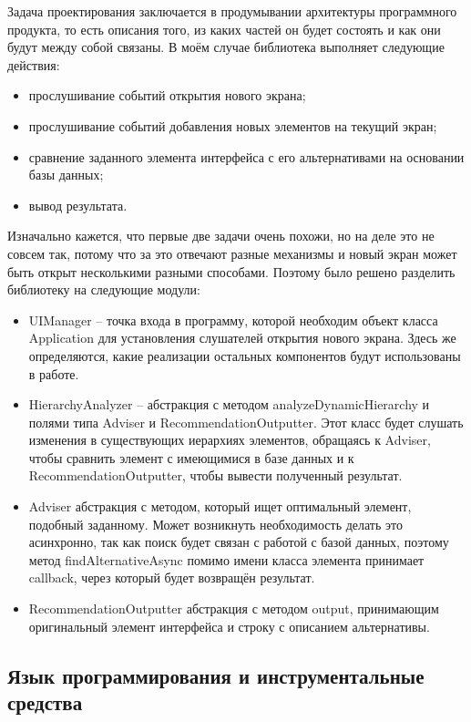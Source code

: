 \documentclass[a4paper,14pt]{extarticle} %
\begin{document}
	Задача проектирования заключается в продумывании архитектуры программного продукта, то есть описания того, из каких частей он будет состоять и как они будут между собой связаны. В моём случае библиотека выполняет следующие действия:
	\begin{itemize}
		\item прослушивание событий открытия нового экрана;
		\item прослушивание событий добавления новых элементов на текущий экран;
		\item сравнение заданного элемента интерфейса с его альтернативами на основании базы данных;
		\item вывод результата.
	\end{itemize}
	Изначально кажется, что первые две задачи очень похожи, но на деле это не совсем так, потому что за это отвечают разные механизмы и новый экран может быть открыт несколькими разными способами. Поэтому было решено разделить библиотеку на следующие модули:
	\begin{itemize}
		\item UIManager – точка входа в программу, которой необходим объект класса Application для установления слушателей открытия нового экрана. Здесь же определяются, какие реализации остальных компонентов будут использованы в работе.
		\item HierarchyAnalyzer – абстракция с методом analyzeDynamicHierarchy и полями типа Adviser и RecommendationOutputter. Этот класс будет слушать изменения в существующих иерархиях элементов, обращаясь к Adviser, чтобы сравнить элемент с имеющимися в базе данных и к RecommendationOutputter, чтобы вывести полученный результат.
		\item Adviser абстракция с методом, который ищет оптимальный элемент, подобный заданному. Может возникнуть необходимость делать это асинхронно, так как поиск будет связан с работой с базой данных, поэтому метод findAlternativeAsync помимо имени класса элемента принимает callback, через который будет возвращён результат.
		\item RecommendationOutputter абстракция с методом output, принимающим оригинальный элемент интерфейса и строку с описанием альтернативы.
	\end{itemize}
	
	\subsection{Язык программирования и  инструментальные средства}
	
\end{document}
